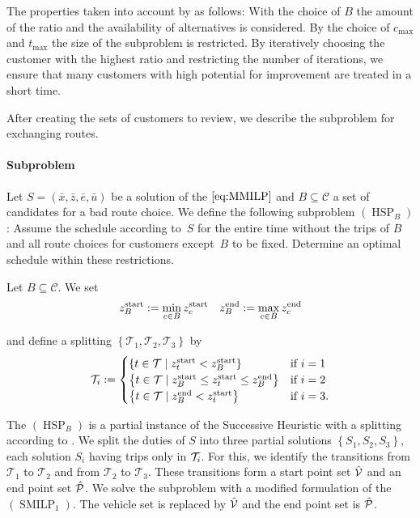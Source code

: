 The properties taken into account by  as follows: With the choice of $B$ the amount of the ratio and the availability of alternatives is considered. By the choice of $c_{\max}$ and $t_{\max}$ the size of the subproblem is restricted. By iteratively choosing the customer with the highest ratio and restricting the number of iterations, we ensure that many customers with high potential for improvement are treated in a short time.

After creating the sets of customers to review, we describe the subproblem for exchanging routes.

\paragraph{Subproblem} \parfill

Let $S=\left(\bar{x},\bar{z},\bar{e},\bar{u}\right)$ be a solution of the $\eqref{eq:MMILP}$ and $B\subseteq\mathcal{C}$ a set of candidates for a bad route choice. We define the following subproblem $(\operatorname{HSP}_B)$: Assume the schedule according to~$S$ for the entire time without the trips of $B$ and all route choices for customers except~$B$ to be fixed. Determine an optimal schedule within these restrictions.

\begin{definition}
\label{def:splitting_HSP}

Let ${B\subseteq\mathcal{C}}$. We set
\begin{align*}
	z^{\operatorname{start}}_B := \min_{c\in B}z^{\operatorname{start}}_c && z^{\operatorname{end}}_B := \max_{c\in B}z^{\operatorname{end}}_c
\end{align*}

and define a splitting $\left\{\mathcal{T}_1,\mathcal{T}_2,\mathcal{T}_3\right\}$ by
\begin{align*}
	\mathcal{T}_i := \begin{cases}
		\left\{t\in\mathcal{T}\mid z^{\operatorname{start}}_t<z^{\operatorname{start}}_B\right\} & \text{if } i=1 \\
		\left\{t\in\mathcal{T}\mid z^{\operatorname{start}}_B\leq z^{\operatorname{start}}_t\leq z^{\operatorname{end}}_B\right\} & \text{if } i=2 \\
		\left\{t\in\mathcal{T}\mid z^{\operatorname{end}}_B<z^{\operatorname{start}}_t\right\} & \text{if } i=3.
	\end{cases}
\end{align*}

\end{definition}

The $(\operatorname{HSP}_B)$ is a partial instance of the Successive Heuristic with a splitting according to . We split the duties of $S$ into three partial solutions $\left\{S_1,S_2,S_3\right\}$, each solution $S_i$ having trips only in $\mathcal{T}_i$. For this, we identify the transitions from $\mathcal{T}_1$ to $\mathcal{T}_2$ and from $\mathcal{T}_2$ to $\mathcal{T}_3$. These transitions form a start point set $\hat{\mathcal{V}}$ and an end point set $\hat{\mathcal{P}}$. We solve the subproblem with a modified formulation of the $(\operatorname{SMILP}_1)$. The vehicle set is replaced by $\hat{\mathcal{V}}$ and the end point set is $\hat{\mathcal{P}}$.

